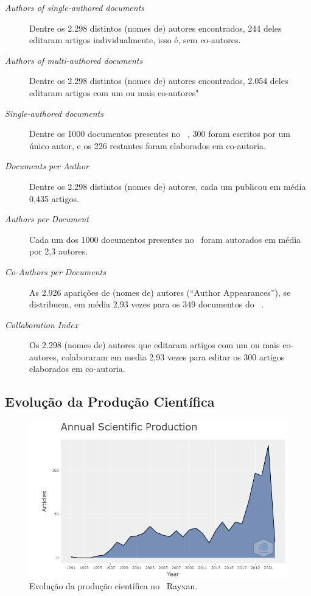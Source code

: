 \begin{description}
    \item [\textit{Authors of single-authored documents}] Dentre os 2.298 distintos (nomes de) autores encontrados, 244 deles editaram artigos individualmente, isso é, sem co-autores.
    \item [\textit{Authors of multi-authored documents}] Dentre os 2.298 distintos (nomes de) autores encontrados, 2.054 deles editaram artigos com um ou mais co-autores"
    \item [\textit{Single-authored documents}] Dentre os 1000 documentos presentes no \dataset\  , 300 foram escritos por um único autor, e os 226 restantes foram elaborados em co-autoria.
    \item [\textit{Documents per Author}] Dentre os 2.298 distintos (nomes de) autores, cada um publicou em média 0,435 artigos.
    \item [\textit{Authors per Document}] Cada um dos 1000 documentos presentes no \dataset\  foram autorados em média por  2,3 autores.
    \item [\textit{Co-Authors per Documents}] As 2.926 aparições de (nomes de) autores (``Author Appearances''), se distribuem, em média 2,93 vezes para os 349 documentos do \dataset\ .
    \item [\textit{Collaboration Index}] Os 2.298 (nomes de) autores que editaram artigos com um ou mais co-autores, colaboraram em media 2,93 vezes para editar os 300 artigos elaborados em co-autoria.
\end{description}

\subsection{Evolução da Produção Científica}

\begin{figure}
    \centering
    \includegraphics[width=1.0\textwidth]{experiments/Rayxan/PesqBibliogr/ComputacaoQuantica/WoS-20220206/AnnualScientific.png}
    \caption{Evolução da produção científica no \dataset\   Rayxan.}
    \label{fig:evol:anual:Rayxan}
\end{figure}

